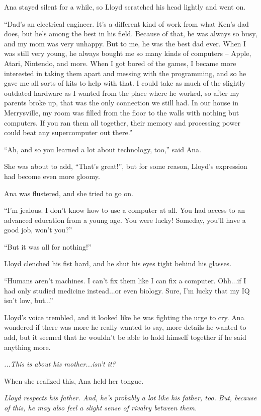 \documentclass[
]{article}
\begin{document}
Ana stayed silent for a while, so Lloyd scratched his head lightly and
went on.

``Dad's an electrical engineer. It's a different kind of work from what
Ken's dad does, but he's among the best in his field. Because of that,
he was always so busy, and my mom was very unhappy. But to me, he was
the best dad ever. When I was still very young, he always bought me so
many kinds of computers -- Apple, Atari, Nintendo, and more. When I got
bored of the games, I became more interested in taking them apart and
messing with the programming, and so he gave me all sorts of kits to
help with that. I could take as much of the slightly outdated hardware
as I wanted from the place where he worked, so after my parents broke
up, that was the only connection we still had. In our house in
Merrysville, my room was filled from the floor to the walls with nothing
but computers. If you ran them all together, their memory and processing
power could beat any supercomputer out there.''

``Ah, and so you learned a lot about technology, too,'' said Ana.

She was about to add, ``That's great!'', but for some reason, Lloyd's
expression had become even more gloomy.

Ana was flustered, and she tried to go on.

``I'm jealous. I don't know how to use a computer at all. You had access
to an advanced education from a young age. You were lucky! Someday,
you'll have a good job, won't you?''

``But it was all for nothing!''

Lloyd clenched his fist hard, and he shut his eyes tight behind his
glasses.

``Humans aren't machines. I can't fix them like I can fix a computer.
Ohh...if I had only studied medicine instead...or even biology. Sure,
I'm lucky that my IQ isn't low, but...''

Lloyd's voice trembled, and it looked like he was fighting the urge to
cry. Ana wondered if there was more he really wanted to say, more
details he wanted to add, but it seemed that he wouldn't be able to hold
himself together if he said anything more.

\emph{...This is about his mother...isn't it?}

When she realized this, Ana held her tongue.

\emph{Lloyd respects his father. And, he's probably a lot like his
father, too. But, because of this, he may also feel a slight sense of
rivalry between them.}
\end{document}

